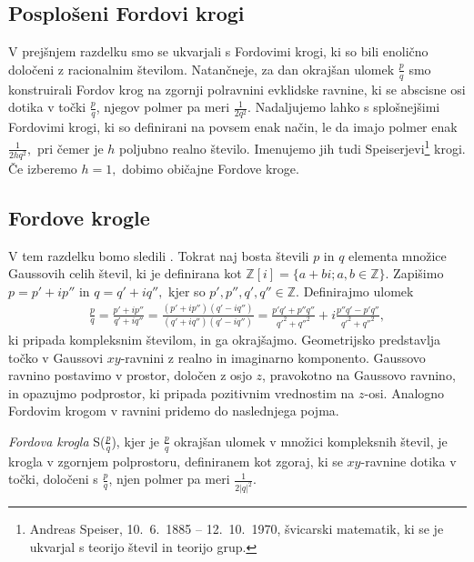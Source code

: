 \documentclass[mat1]{fmfdelo}
\newcommand{\Z}{\mathbb Z}
\begin{document}
\subsection{Posplošeni Fordovi krogi}

V prejšnjem razdelku smo se ukvarjali s Fordovimi krogi, ki so bili enolično določeni z racionalnim številom. Natančneje, za dan okrajšan ulomek $\frac{p}{q}$ smo konstruirali Fordov krog na zgornji polravnini evklidske ravnine, ki se abscisne osi dotika v točki $\frac{p}{q}$, njegov polmer pa meri $\frac{1}{2q^2}.$
Nadaljujemo lahko s splošnejšimi Fordovimi krogi, ki so definirani na povsem enak način, le da imajo polmer enak $\frac{1}{2hq^2},$ pri čemer je $h$ poljubno realno število. Imenujemo jih tudi Speiserjevi\footnote{Andreas Speiser, 10.\ 6.\ 1885 -- 12.\ 10.\ 1970, švicarski matematik, ki se je ukvarjal s teorijo števil in teorijo grup.} krogi. Če izberemo $h=1,$ dobimo običajne Fordove kroge.

\subsection{Fordove krogle}

V tem razdelku bomo sledili \cite[poglavje 8]{ford}.
Tokrat naj bosta števili $p$ in $q$ elementa množice Gaussovih celih števil, ki je definirana kot $\mathbb{Z}\left[{i}\right] = \{a+bi; a,b \in \Z \}.$ Zapišimo $p = p'+ip''$ in $q = q'+iq'',$ kjer so $p', p'', q', q'' \in \Z.$ Definirajmo ulomek
\begin{align} 
\frac{p}{q} = \frac{p'+ip''}{q'+iq''} = \frac{(p'+ip'')(q'-iq'')}{(q'+iq'')(q'-iq'')} = \frac{p'q'+p''q''}{q'^2+q''^2} + i \frac{p''q'-p'q''}{q'^2+q''^2},
\end{align}
ki pripada kompleksnim številom, in ga okrajšajmo. Geometrijsko predstavlja točko v Gaussovi $xy$-ravnini z realno in imaginarno komponento. Gaussovo ravnino postavimo v prostor, določen z osjo $z$, pravokotno na Gaussovo ravnino, in opazujmo podprostor, ki pripada pozitivnim vrednostim na $z$-osi. Analogno Fordovim krogom v ravnini pridemo do naslednjega pojma. 

\begin{definicija}
\emph{Fordova krogla} S($\frac{p}{q}$), kjer je $\frac{p}{q}$ okrajšan ulomek v množici kompleksnih števil, je krogla v zgornjem polprostoru, definiranem kot zgoraj, ki se $xy$-ravnine dotika v točki, določeni s $\frac{p}{q}$, njen polmer pa meri $\frac{1}{2|q|^2}.$
\end{definicija}
\end{document}
